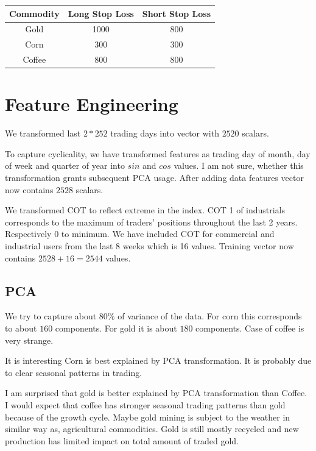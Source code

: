 \documentclass[final,2p]{elsarticle}
\begin{document}
\begin{center}
\begin{tabular}{|c|c|c|}
    \hline
    Commodity & Long Stop Loss & Short Stop Loss \\
    \hline
    Gold & 1000 & 800 \\
    Corn & 300 & 300 \\
    Coffee & 800 & 800 \\
    \hline
\end{tabular}
\end{center}

\clearpage

\section{Feature Engineering}

We transformed last $2*252$ trading days into vector with $2520$ scalars.

To capture cyclicality, we have transformed features as trading day of month, day of week and quarter of year into $sin$ and $cos$ values.
I am not sure, whether this transformation grants subsequent PCA usage.
After adding data features vector now contains $2528$ scalars.

We transformed COT to reflect extreme in the index. COT 1 of industrials corresponds to the maximum of traders' positions throughout the last 2 years.
Respectively 0 to minimum. We have included COT for commercial and industrial users from the last 8 weeks which is 16 values.
Training vector now contains $2528+16=2544$ values.

\subsection{PCA}
We try to capture about 80\% of variance of the data. For corn this corresponds to about $160$ components. For gold it is about $180$ components.
Case of coffee is very strange.

It is interesting Corn is best explained by PCA transformation. It is probably due to clear seasonal patterns in trading.

I am surprised that gold is better explained by PCA transformation than Coffee. I would expect that coffee has stronger seasonal trading patterns than gold because of the growth cycle. Maybe gold mining is subject to the weather in similar way as, agricultural commodities. Gold is still mostly recycled and new production has limited impact on total amount of traded gold.
\end{document}
